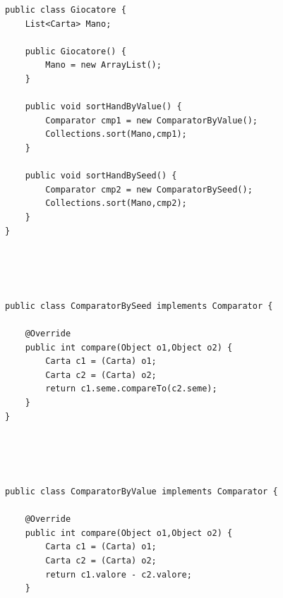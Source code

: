 \documentclass[10pt,a4paper]{book}
\begin{document}
\begin{verbatim}
public class Giocatore {
    List<Carta> Mano;
    
    public Giocatore() {
        Mano = new ArrayList();
    }

    public void sortHandByValue() {
        Comparator cmp1 = new ComparatorByValue();
        Collections.sort(Mano,cmp1);
    }
    
    public void sortHandBySeed() {
        Comparator cmp2 = new ComparatorBySeed();
        Collections.sort(Mano,cmp2);
    }
}

\end{verbatim}
\\\\\\
\begin{verbatim}
public class ComparatorBySeed implements Comparator {
    
    @Override
    public int compare(Object o1,Object o2) {
        Carta c1 = (Carta) o1;
        Carta c2 = (Carta) o2;
        return c1.seme.compareTo(c2.seme);
    }
}

\end{verbatim}
\\\\\\
\begin{verbatim}
public class ComparatorByValue implements Comparator {
    
    @Override
    public int compare(Object o1,Object o2) {
        Carta c1 = (Carta) o1;
        Carta c2 = (Carta) o2;
        return c1.valore - c2.valore;
    } 

\end{verbatim}
\newpage
\end{document}
